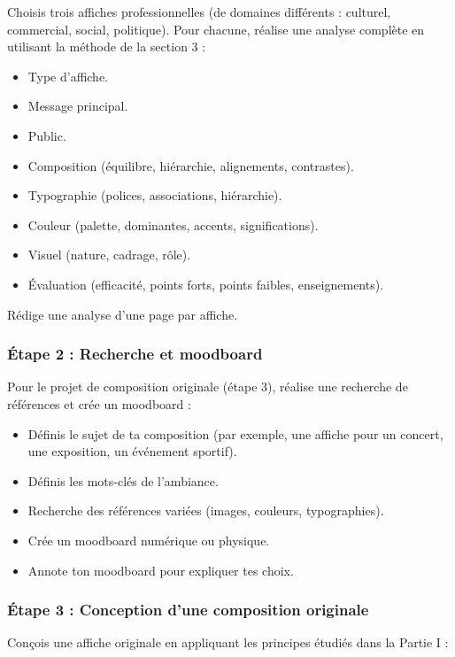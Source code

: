 Choisis trois affiches professionnelles (de domaines différents : culturel, commercial, social, politique). Pour chacune, réalise une analyse complète en utilisant la méthode de la section 3 :

\begin{itemize}
    \item Type d'affiche.
    \item Message principal.
    \item Public.
    \item Composition (équilibre, hiérarchie, alignements, contrastes).
    \item Typographie (polices, associations, hiérarchie).
    \item Couleur (palette, dominantes, accents, significations).
    \item Visuel (nature, cadrage, rôle).
    \item Évaluation (efficacité, points forts, points faibles, enseignements).
\end{itemize}

Rédige une analyse d'une page par affiche.

\subsubsection*{Étape 2 : Recherche et moodboard}

Pour le projet de composition originale (étape 3), réalise une recherche de références et crée un moodboard :

\begin{itemize}
    \item Définis le sujet de ta composition (par exemple, une affiche pour un concert, une exposition, un événement sportif).
    \item Définis les mots-clés de l'ambiance.
    \item Recherche des références variées (images, couleurs, typographies).
    \item Crée un moodboard numérique ou physique.
    \item Annote ton moodboard pour expliquer tes choix.
\end{itemize}

\subsubsection*{Étape 3 : Conception d'une composition originale}

Conçois une affiche originale en appliquant les principes étudiés dans la Partie I :

